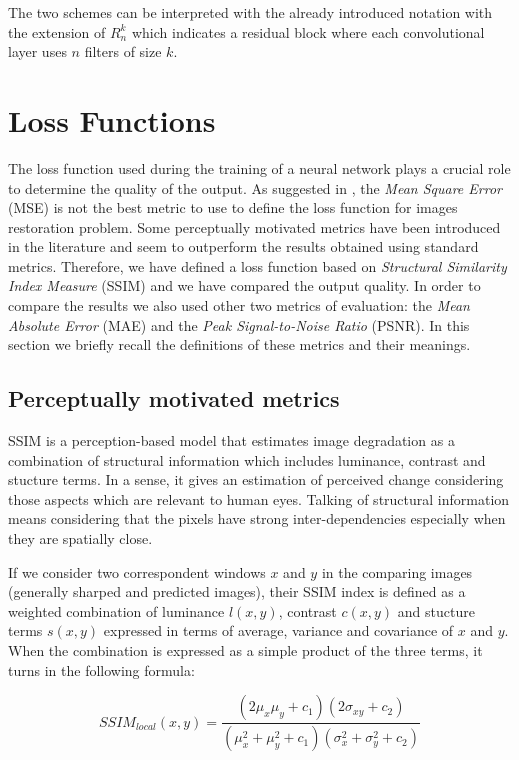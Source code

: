\documentclass[12pt,a4paper]{article}
\begin{document}
The two schemes can be interpreted with the already introduced notation with the extension of $R_n^k$ which indicates a residual block where each convolutional layer uses $n$ filters of size $k$.

\section{Loss Functions}
The loss function used during the training of a neural network plays a crucial role to determine the quality of the output. As suggested in \cite{Z&G&F}, the \textit{Mean Square Error} (MSE) is not the best metric to use to define the loss function for images restoration problem. Some perceptually motivated metrics have been introduced in the literature and seem to outperform the results obtained using standard metrics. Therefore, we have defined a loss function based on \textit{Structural Similarity Index Measure} (SSIM) and we have compared the output quality. In order to compare the results we also used other two metrics of evaluation: the \textit{Mean Absolute Error} (MAE) and the \textit{Peak Signal-to-Noise Ratio} (PSNR). In this section we briefly recall the definitions of these metrics and their meanings. 

\subsection{Perceptually motivated metrics}
SSIM is a perception-based model that estimates image degradation as a combination of structural information which includes luminance, contrast and stucture terms. In a sense, it gives an estimation of perceived change considering those aspects which are relevant to human eyes. Talking of structural information means considering that the pixels have strong inter-dependencies especially when they are spatially close. 

If we consider two correspondent windows $x$ and $y$ in the comparing images (generally sharped and predicted images), their SSIM index is defined as a weighted combination of luminance $l(x,y)$, contrast $c(x,y)$ and stucture terms $s(x,y)$ expressed in terms of average, variance and covariance of $x$ and $y$. When the combination is expressed as a simple product of the three terms, it turns in the following formula:

\begin{equation}
SSIM_{local}(x,y) = \frac{(2\mu_x\mu_y+c_1)(2\sigma_{xy}+c_2)}{(\mu_x^2+\mu_y^2+c_1)(\sigma_x^2+\sigma_y^2+c_2)}
\end{equation}
\end{document}
